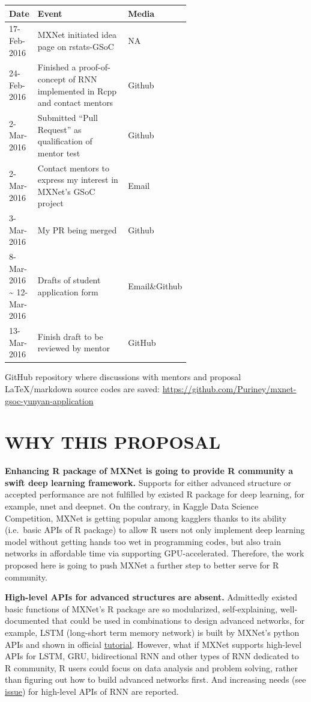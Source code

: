 \documentclass[]{article}
\begin{document}
\begin{longtable}[l]{l p{0.6\linewidth} l}
\toprule
Date & Event & Media\tabularnewline
\midrule
\endhead
17-Feb-2016 & MXNet initiated idea page on rstats-GSoC & NA\tabularnewline
24-Feb-2016 & Finished a proof-of-concept of RNN implemented in Rcpp and
contact mentors & Github\tabularnewline
2-Mar-2016 & Submitted ``Pull Request'' as qualification of mentor test &
Github\tabularnewline
2-Mar-2016 & Contact mentors to express my interest in MXNet's GSoC
project & Email\tabularnewline
3-Mar-2016 & My PR being merged & Github\tabularnewline
8-Mar-2016 \textasciitilde{} 12-Mar-2016 & Drafts of student application
form & Email\&Github\tabularnewline
13-Mar-2016 & Finish draft to be reviewed by mentor &
GitHub\tabularnewline
\bottomrule
\end{longtable}

GitHub repository where discussions with mentors and proposal LaTeX/markdown source codes are saved: \href{https://github.com/Puriney/mxnet-gsoc-yunyan-application}{https://github.com/Puriney/mxnet-gsoc-yunyan-application}

\section{WHY THIS PROPOSAL}\label{why-this-proposal}

\textbf{Enhancing R package of MXNet is going to provide R community a
swift deep learning framework.} Supports for either advanced structure
or accepted performance are not fulfilled by existed R package for deep
learning, for example, nnet and deepnet. On the contrary, in Kaggle Data
Science Competition, MXNet is getting popular among kagglers thanks to
its ability (i.e.~basic APIs of R package) to allow R users not only
implement deep learning model without getting hands too wet in
programming codes, but also train networks in affordable time via
supporting GPU-accelerated. Therefore, the work proposed here is going
to push MXNet a further step to better serve for R community.

\textbf{High-level APIs for advanced structures are absent.} Admittedly
existed basic functions of MXNet's R package are so modularized,
self-explaining, well-documented that could be used in combinations to
design advanced networks, for example, LSTM (long-short term memory
network) is built by MXNet's python APIs and shown in official
\href{https://github.com/Puriney/mxnet/tree/master/example/rnn}{tutorial}.
However, what if MXNet supports high-level APIs for LSTM, GRU,
bidirectional RNN and other types of RNN dedicated to R community, R
users could focus on data analysis and problem solving, rather than
figuring out how to build advanced networks first. And increasing needs
(see \href{https://github.com/dmlc/mxnet/issues/837}{issue}) for
high-level APIs of RNN are reported.
\end{document}
